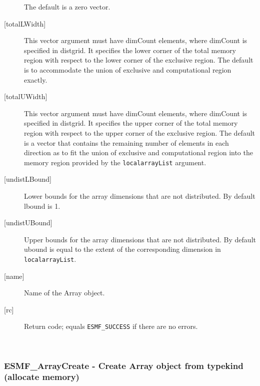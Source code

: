 \begin{description}
   The default is a zero vector.
   \item[{[totalLWidth]}]
   This vector argument must have dimCount elements, where dimCount is
   specified in distgrid. It specifies the lower corner of the total memory
   region with respect to the lower corner of the exclusive region.
   The default is to accommodate the union of exclusive and computational
   region exactly.
   \item[{[totalUWidth]}]
   This vector argument must have dimCount elements, where dimCount is
   specified in distgrid. It specifies the upper corner of the total memory
   region with respect to the upper corner of the exclusive region.
   The default is a vector that contains the remaining number of elements
   in each direction as to fit the union of exclusive and computational
   region into the memory region provided by the {\tt localarrayList} argument.
   \item[{[undistLBound]}]
   Lower bounds for the array dimensions that are not distributed.
   By default lbound is 1.
   \item[{[undistUBound]}]
   Upper bounds for the array dimensions that are not distributed.
   By default ubound is equal to the extent of the corresponding
   dimension in {\tt localarrayList}.
   \item[{[name]}]
   Name of the Array object.
   \item[{[rc]}]
   Return code; equals {\tt ESMF\_SUCCESS} if there are no errors.
   \end{description}
   
 
\mbox{}\hrulefill\ 
 
\subsubsection [ESMF\_ArrayCreate] {ESMF\_ArrayCreate - Create Array object from typekind (allocate memory)}


